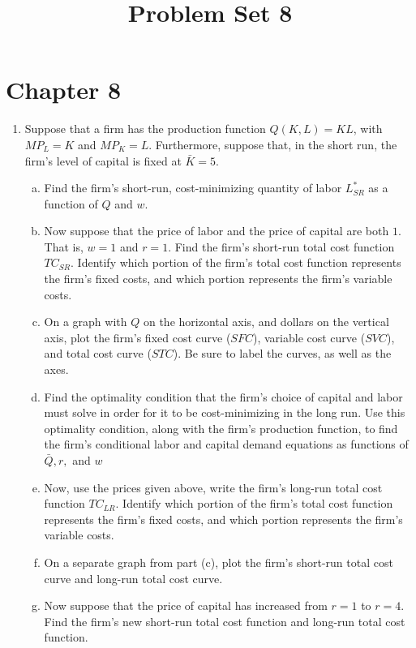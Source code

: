 \documentclass[11pt]{article}
\title{Problem Set 8}
\begin{document}
  
\section*{Chapter 8}

\begin{enumerate}
  \item Suppose that a firm has the production function $Q(K,L) = KL$, with $MP_L = K$ and $MP_K = L$. Furthermore, suppose that, in the short run, the firm’s level of capital is fixed at $\bar{K} = 5$.
  
  \begin{enumerate}[(a)]
    \item Find the firm’s short-run, cost-minimizing quantity of labor $L^{*}_{SR}$ as a function of $Q$ and $w$.
    
    \item Now suppose that the price of labor and the price of capital are both $1$. That is, $w = 1$ and $r = 1$. Find the firm’s short-run total cost function $TC_{SR}$. Identify which portion of the firm’s total cost function represents the firm’s fixed costs, and which portion represents the firm’s variable costs.
    
    \item On a graph with $Q$ on the horizontal axis, and dollars on the vertical axis, plot the firm’s fixed cost curve ($SFC$), variable cost curve ($SVC$), and total cost curve ($STC$). Be sure to label the curves, as well as the axes.

    \item Find the optimality condition that the firm’s choice of capital and labor must solve in order for it to be cost-minimizing in the long run. Use this optimality condition, along with the firm’s production function, to find the firm’s conditional labor and capital demand equations as functions of $\bar{Q}, r,$ and $w$

    \item Now, use the prices given above, write the firm’s long-run total cost function $TC_{LR}$. Identify which portion of the firm’s total cost function represents the firm’s fixed costs, and which portion represents the firm’s variable costs.

    \item On a separate graph from part (c), plot the firm’s short-run total cost curve and long-run total cost curve.

    \item Now suppose that the price of capital has increased from $r = 1$ to $r = 4$. Find the firm’s new short-run total cost function and long-run total cost function.


\end{enumerate}
\end{enumerate}
\end{document}

